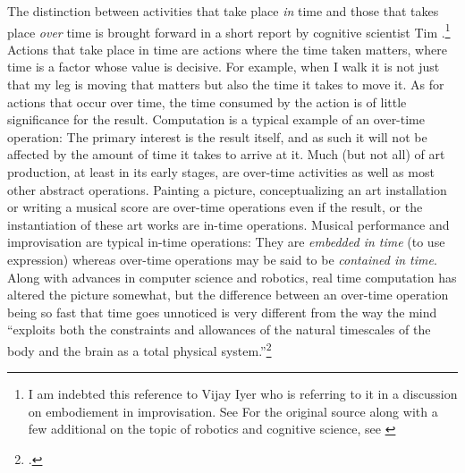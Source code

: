 The distinction between activities that take place \emph{in} time and those that takes place \emph{over} time is brought forward in a short report by cognitive scientist Tim \citeauthor{smithers96}.\footnote{I am indebted this reference to Vijay Iyer who is referring to it in a discussion on embodiement in improvisation. See \cite{iyer08} For the original source along with a few additional on the topic of robotics and cognitive science, see \cite[See][]{smithers96,vangelder98,smithers:98}} Actions that take place in time are actions where the time taken matters, where time is a factor whose value is decisive. For example, when I walk it is not just that my leg is moving that matters but also the time it takes to move it. As for actions that occur over time, the time consumed by the action is of little significance for the result. Computation is a typical example of an over-time operation: The primary interest is the result itself, and as such it will not be affected by the amount of time it takes to arrive at it. Much (but not all) of art production, at least in its early stages, are over-time activities as well as most other abstract operations. Painting a picture, conceptualizing an art installation or writing a musical score are over-time operations even if the result, or the instantiation of these art works are in-time operations. Musical performance and improvisation are typical in-time operations: They are \emph{embedded in time} (to use \citeauthor{smithers96} expression) whereas over-time operations may be said to be \emph{contained in time}. Along with advances in computer science and robotics, real time computation has altered the picture somewhat, but the difference between an over-time operation being so fast that time goes unnoticed is very different from the way the mind ``exploits both the constraints and allowances of the natural timescales of the body and the brain as a total physical system.''\footcite[276]{iyer08}


